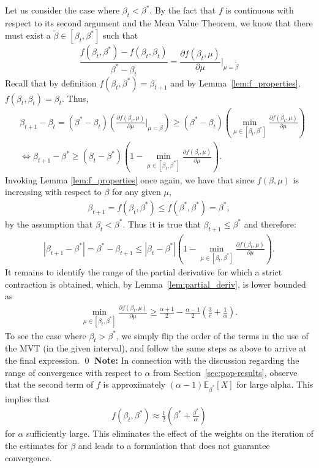 \documentclass[runningheads]{llncs}
\newcommand{\E}{\mathbb{E}}
\begin{document}
\begin{subappendices}
Let us consider the case where $\beta_t < \beta^*$.
By the fact that $f$ is continuous with respect to its second argument and the
Mean Value Theorem, we know that there must exist a
$\tilde{\beta} \in [\beta_t, \beta^*]$
such that
\begin{equation*}
  \frac{f(\beta_t, \beta^*) - f(\beta_t, \beta_t)}{\beta^*-\beta_t}
  = \frac{\partial f(\beta_t,\mu)}{\partial \mu} \Bigg|_{\mu = \tilde{\beta}}
\end{equation*}
Recall that by definition $f(\beta_t, \beta^*) = \beta_{t+1}$
and by Lemma~\ref{lem:f_properties}, $f(\beta_t, \beta_t) = \beta_t$.
Thus,
\begin{align*}
  & \beta_{t+1} - \beta_t
    = (\beta^*-\beta_t) \left( \frac{\partial f(\beta_t,\mu)}{\partial \mu} \Bigg|_{\mu = \tilde{\beta}}\right)
    \geq (\beta^* - \beta_t) \left( \min_{\mu \in [\beta_t, \beta^*]} \frac{\partial f(\beta_t,\mu)}{\partial \mu} \right)
  \\
  & \iff \beta_{t+1}-\beta^* \geq (\beta_t - \beta^*) \left( 1- \min_{\mu \in [\beta_t, \beta^*]} \frac{\partial f(\beta_t,\mu)}{\partial \mu} \right).
\end{align*}
Invoking Lemma \ref{lem:f_properties} once again,
we have that since $f(\beta, \mu)$ is increasing with respect to $\beta$ for any
given $\mu$,
\begin{align*}
  \beta_{t+1} = f(\beta_t, \beta^*) \leq f(\beta^*, \beta^*) = \beta^*,
\end{align*}
by the assumption that $\beta_t < \beta^*$.
Thus it is true that $\beta_{t+1} \leq \beta^*$ and therefore:
\begin{align*}
    |\beta_{t+1}-\beta^*|
  = \beta^*-\beta_{t+1}
  \leq  |\beta_t-\beta^*| \left( 1- \min_{\mu \in [\beta_t, \beta^*]} \frac{\partial f(\beta_t,\mu)}{\partial \mu} \right).
\end{align*}
It remains to identify the range of the partial derivative for which a strict
contraction is obtained, which, by Lemma~\ref{lem:partial_deriv}, is lower bounded as
\begin{align*}
  \min_{\mu \in [\beta_t, \beta^*]} \frac{\partial f(\beta_t,\mu)}{\partial \mu}
  \geq
    \frac{\alpha+1}{2} - \frac{\alpha-1}{2}\left(\frac{3}{e} + \frac{1}{\alpha} \right).
\end{align*}
To see the case where $\beta_t > \beta^*$, we simply flip the order of the terms
in the use of the MVT (in the given interval), and follow the same steps as above
to arrive at the final expression.
\qed
\vspace{0.2cm}
\noindent
\textbf{Note:} In connection with the discussion regarding the range of
convergence with respect to $\alpha$ from Section~\ref{sec:pop-results},
observe that the second term of $f$ is approximately $(\alpha -
1)\E_{\beta^*}[X]$ for large alpha.
This implies that
\begin{align*}
  f(\beta_t, \beta^*)
  \approx
  \frac{1}{2}(\beta^* + \frac{\beta^*}{\alpha})
\end{align*}
for $\alpha$ sufficiently large. This eliminates the effect of the weights on the
iteration of the estimates for $\beta$ and leads to a formulation that does not
guarantee convergence.


\end{subappendices}
\end{document}
